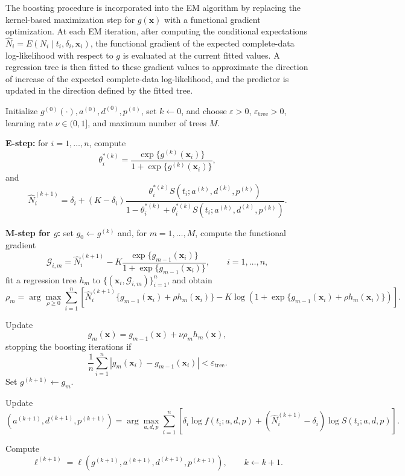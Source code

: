 The boosting procedure is incorporated into the EM algorithm by replacing the
kernel-based maximization step for $g(\mathbf{x})$ with a functional gradient
optimization. At each EM iteration, after computing the conditional expectations
$\widehat{N}_i=E(N_i\mid t_i,\delta_i,\mathbf{x}_i)$, the functional gradient of
the expected complete-data log-likelihood with respect to $g$ is evaluated at the
current fitted values. A regression tree is then fitted to these gradient values
to approximate the direction of increase of the expected complete-data
log-likelihood, and the predictor is updated in the direction defined by the
fitted tree.

\begin{algorithm}[H]
\caption{EM algorithm with gradient boosting -
\label{alg:functional_gradient_boosting}
$N_i \sim \mathrm{Binomial}(K,\theta_i^*)$.}
\begin{algorithmic}[1]

\State Initialize
$g^{(0)}(\cdot),a^{(0)},d^{(0)},p^{(0)}$,
set $k\gets0$, and choose $\varepsilon>0$, $\varepsilon_{\mathrm{tree}}>0$,
learning rate $\nu\in(0,1]$, and maximum number of trees $M$.


\State \textbf{E-step:} for $i=1,\ldots,n$, compute
\[
\theta_i^{*(k)}
=
\frac{\exp\{g^{(k)}(\mathbf{x}_i)\}}
     {1+\exp\{g^{(k)}(\mathbf{x}_i)\}},
\]
and
\[
\widehat N_i^{(k+1)}
=
\delta_i
+
(K-\delta_i)
\frac{
\theta_i^{*(k)}
S(t_i;a^{(k)},d^{(k)},p^{(k)})
}{
1-\theta_i^{*(k)}
+
\theta_i^{*(k)}
S(t_i;a^{(k)},d^{(k)},p^{(k)})
}.
\]

\State \textbf{M-step for $g$:} set $g_0\gets g^{(k)}$ and, for
$m=1,\ldots,M$, compute the functional gradient
\[
\mathcal{G}_{i,m}
=
\widehat N_i^{(k+1)}
-
K
\frac{\exp\{g_{m-1}(\mathbf{x}_i)\}}
     {1+\exp\{g_{m-1}(\mathbf{x}_i)\}},
\qquad i=1,\ldots,n,
\]
fit a regression tree $h_m$ to
$\{(\mathbf{x}_i,\mathcal{G}_{i,m})\}_{i=1}^n$, and obtain
\[
\rho_m
=
\arg\max_{\rho\geq0}
\sum_{i=1}^{n}
\left[
\widehat N_i^{(k+1)}
\{g_{m-1}(\mathbf{x}_i)+\rho h_m(\mathbf{x}_i)\}
-
K\log
\left(
1+\exp\{g_{m-1}(\mathbf{x}_i)+\rho h_m(\mathbf{x}_i)\}
\right)
\right].
\]

\State Update
\[
g_m(\mathbf{x})
=
g_{m-1}(\mathbf{x})
+
\nu\rho_m h_m(\mathbf{x}),
\]
stopping the boosting iterations if
\[
\frac{1}{n}
\sum_{i=1}^{n}
\left|
g_m(\mathbf{x}_i)-g_{m-1}(\mathbf{x}_i)
\right|
<
\varepsilon_{\mathrm{tree}}.
\]
Set $g^{(k+1)}\gets g_m$.

\State Update
\[
(a^{(k+1)},d^{(k+1)},p^{(k+1)})
=
\arg\max_{a,d,p}
\sum_{i=1}^{n}
\left[
\delta_i\log f(t_i;a,d,p)
+
(\widehat N_i^{(k+1)}-\delta_i)
\log S(t_i;a,d,p)
\right].
\]

\State Compute
\[
\ell^{(k+1)}
=
\ell\!\left(
g^{(k+1)},a^{(k+1)},d^{(k+1)},p^{(k+1)}
\right),
\qquad
k\gets k+1.
\]

\EndWhile

\end{algorithmic}
\end{algorithm}

